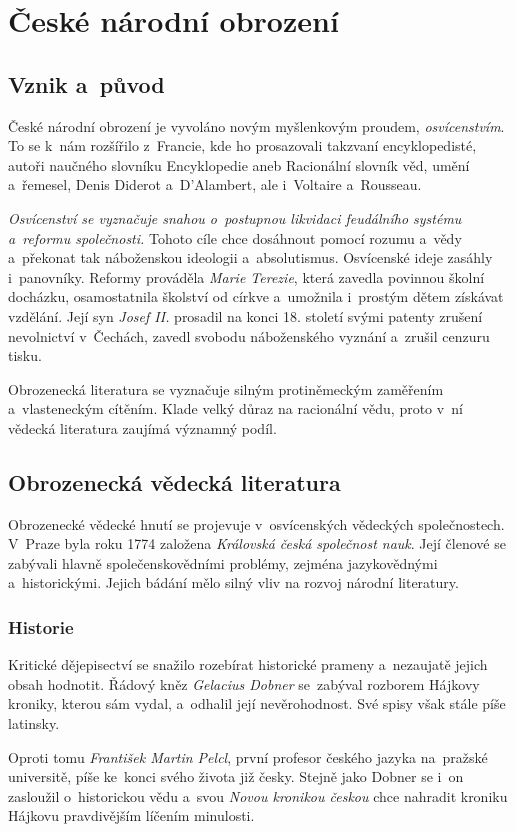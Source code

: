 \chapter{České národní obrození
}
\section{Vznik a~původ
}
České národní obrození je vyvoláno novým myšlenkovým proudem,
\emph{osvícenstvím}. To se k~nám rozšířilo z~Francie, kde ho prosazovali
takzvaní encyklopedisté, autoři naučného slovníku Encyklopedie aneb
Racionální slovník věd, umění a~řemesel, Denis Diderot a~D'Alambert, ale
i~Voltaire a~Rousseau.

\emph{Osvícenství se vyznačuje snahou o~postupnou likvidaci feudálního systému a~reformu společnosti.} Tohoto cíle chce dosáhnout pomocí rozumu
a~vědy a~překonat tak náboženskou ideologii a~absolutismus. Osvícenské
ideje zasáhly i~panovníky. Reformy prováděla \emph{Marie Terezie}, která
zavedla povinnou školní docházku, osamostatnila školství od církve
a~umožnila i~prostým dětem získávat vzdělání. Její syn \emph{Josef II.}
prosadil na konci 18. století svými patenty zrušení nevolnictví
v~Čechách, zavedl svobodu náboženského vyznání a~zrušil cenzuru tisku.

Obrozenecká literatura se vyznačuje silným protiněmeckým zaměřením
a~vlasteneckým cítěním. Klade velký důraz na racionální vědu, proto v~ní
vědecká literatura zaujímá významný podíl.

\section{Obrozenecká vědecká literatura
}
Obrozenecké vědecké hnutí se projevuje v~osvícenských vědeckých
společnostech. V~Praze byla roku 1774 založena \emph{Královská česká společnost nauk}. 
Její členové se zabývali hlavně společenskovědními problémy, zejména
jazykovědnými a~historickými. Jejich bádání mělo silný vliv na rozvoj
národní literatury.

\subsection*{Historie
}
Kritické dějepisectví se snažilo rozebírat historické prameny 
a~nezaujatě jejich obsah hodnotit. Řádový kněz \emph{Gelacius Dobner}
se~zabýval rozborem Hájkovy kroniky, kterou sám vydal, a~odhalil její
nevěrohodnost. Své spisy však stále píše latinsky.

Oproti tomu \emph{František Martin Pelcl}, první profesor českého jazyka 
na~pražské universitě, píše ke~konci svého života již česky. Stejně jako
Dobner se i~on zasloužil o~historickou vědu a~svou \emph{Novou kronikou českou}
chce nahradit kroniku Hájkovu pravdivějším líčením minulosti.

